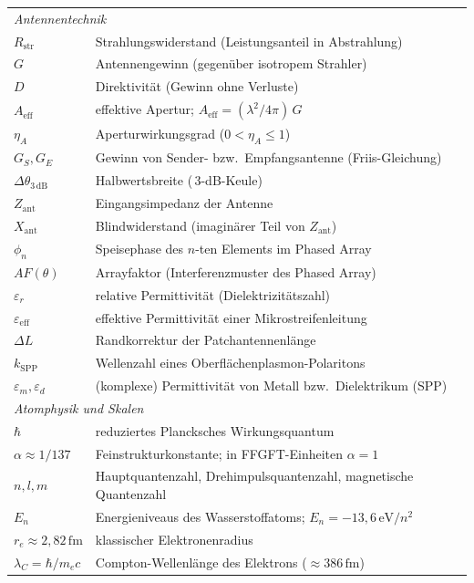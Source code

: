 \begin{longtable}{@{}lp{7cm}@{}}
\midrule
\multicolumn{2}{l}{\textit{Antennentechnik}} \\
$R_\mathrm{str}$ & Strahlungswiderstand (Leistungsanteil in Abstrahlung) \\
$G$ & Antennengewinn (gegenüber isotropem Strahler) \\
$D$ & Direktivität (Gewinn ohne Verluste) \\
$A_\mathrm{eff}$ & effektive Apertur; $A_\mathrm{eff} = (\lambda^2/4\pi)\,G$ \\
$\eta_A$ & Aperturwirkungsgrad ($0 < \eta_A \leq 1$) \\
$G_S, G_E$ & Gewinn von Sender- bzw.\ Empfangsantenne (Friis-Gleichung) \\
$\Delta\theta_{3\,\mathrm{dB}}$ & Halbwertsbreite (\,3-dB-Keule) \\
$Z_\mathrm{ant}$ & Eingangsimpedanz der Antenne \\
$X_\mathrm{ant}$ & Blindwiderstand (imaginärer Teil von $Z_\mathrm{ant}$) \\
$\phi_n$ & Speisephase des $n$-ten Elements im Phased Array \\
$AF(\theta)$ & Arrayfaktor (Interferenzmuster des Phased Array) \\
$\varepsilon_r$ & relative Permittivität (Dielektrizitätszahl) \\
$\varepsilon_\mathrm{eff}$ & effektive Permittivität einer Mikrostreifenleitung \\
$\Delta L$ & Randkorrektur der Patchantennenlänge \\
$k_\mathrm{SPP}$ & Wellenzahl eines Oberflächenplasmon-Polaritons \\
$\varepsilon_m, \varepsilon_d$ & (komplexe) Permittivität von Metall bzw.\ Dielektrikum (SPP) \\
\midrule
\multicolumn{2}{l}{\textit{Atomphysik und Skalen}} \\
$\hbar$ & reduziertes Plancksches Wirkungsquantum \\
$\alpha \approx 1/137$ & Feinstrukturkonstante; in FFGFT-Einheiten $\alpha = 1$ \\
$n, l, m$ & Hauptquantenzahl, Drehimpulsquantenzahl, magnetische Quantenzahl \\
$E_n$ & Energieniveaus des Wasserstoffatoms; $E_n = -13{,}6\,\mathrm{eV}/n^2$ \\
$r_e \approx 2{,}82\,\mathrm{fm}$ & klassischer Elektronenradius \\
$\lambda_C = \hbar/m_e c$ & Compton-Wellenlänge des Elektrons (${\approx}386\,\mathrm{fm}$) \\

\end{longtable}

